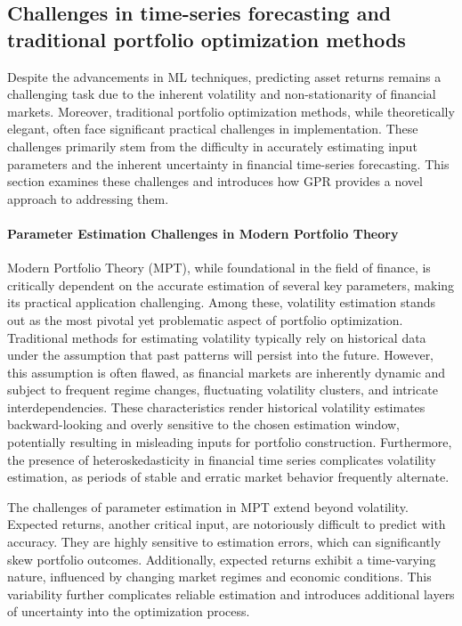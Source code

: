 \subsection{Challenges in time-series forecasting and traditional portfolio optimization methods}
Despite the advancements in \ac{ML} techniques, predicting asset returns remains a challenging task due to the inherent volatility and non-stationarity of financial markets.
Moreover, traditional portfolio optimization methods, while theoretically elegant, often face significant practical challenges in implementation. These challenges primarily stem from the difficulty in accurately estimating input parameters and the inherent uncertainty in financial time-series forecasting. 
This section examines these challenges and introduces how \ac{GPR} provides a novel approach to addressing them.

\paragraph{Parameter Estimation Challenges in Modern Portfolio Theory}
Modern Portfolio Theory (MPT), while foundational in the field of finance, is critically dependent on the accurate estimation of several key parameters, making its practical application challenging. Among these, volatility estimation stands out as the most pivotal yet problematic aspect of portfolio optimization. Traditional methods for estimating volatility typically rely on historical data under the assumption that past patterns will persist into the future. However, this assumption is often flawed, as financial markets are inherently dynamic and subject to frequent regime changes, fluctuating volatility clusters, and intricate interdependencies. These characteristics render historical volatility estimates backward-looking and overly sensitive to the chosen estimation window, potentially resulting in misleading inputs for portfolio construction. Furthermore, the presence of heteroskedasticity in financial time series complicates volatility estimation, as periods of stable and erratic market behavior frequently alternate.

The challenges of parameter estimation in \ac{MPT} extend beyond volatility. Expected returns, another critical input, are notoriously difficult to predict with accuracy. They are highly sensitive to estimation errors, which can significantly skew portfolio outcomes. Additionally, expected returns exhibit a time-varying nature, influenced by changing market regimes and economic conditions. This variability further complicates reliable estimation and introduces additional layers of uncertainty into the optimization process.

